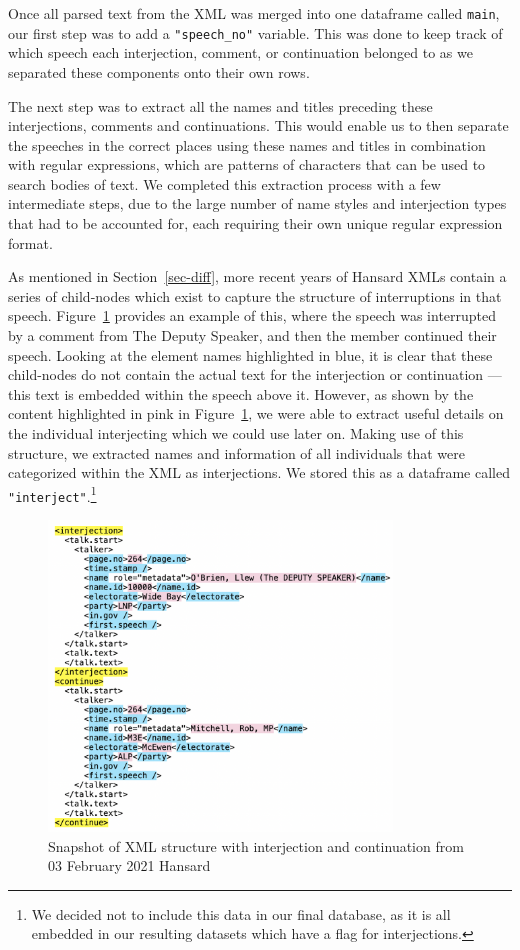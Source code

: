\documentclass[
  letterpaper,
  DIV=11,
  numbers=noendperiod]{scrartcl}
\begin{document}
Once all parsed text from the XML was merged into one dataframe called
\texttt{main}, our first step was to add a \texttt{"speech\_no"}
variable. This was done to keep track of which speech each interjection,
comment, or continuation belonged to as we separated these components
onto their own rows.

The next step was to extract all the names and titles preceding these
interjections, comments and continuations. This would enable us to then
separate the speeches in the correct places using these names and titles
in combination with regular expressions, which are patterns of
characters that can be used to search bodies of text. We completed this
extraction process with a few intermediate steps, due to the large
number of name styles and interjection types that had to be accounted
for, each requiring their own unique regular expression format.

As mentioned in Section~\ref{sec-diff}, more recent years of Hansard
XMLs contain a series of child-nodes which exist to capture the
structure of interruptions in that speech. Figure~\ref{fig-xml3}
provides an example of this, where the speech was interrupted by a
comment from The Deputy Speaker, and then the member continued their
speech. Looking at the element names highlighted in blue, it is clear
that these child-nodes do not contain the actual text for the
interjection or continuation --- this text is embedded within the speech
above it. However, as shown by the content highlighted in pink in
Figure~\ref{fig-xml3}, we were able to extract useful details on the
individual interjecting which we could use later on. Making use of this
structure, we extracted names and information of all individuals that
were categorized within the XML as interjections. We stored this as a
dataframe called \texttt{"interject"}.\footnote{We decided not to
  include this data in our final database, as it is all embedded in our
  resulting datasets which have a flag for interjections.}

\begin{figure}

{\centering \includegraphics[width=3.59375in,height=\textheight]{images/xml3.png}

}

\caption{\label{fig-xml3}Snapshot of XML structure with interjection and
continuation from 03 February 2021 Hansard}

\end{figure}
\end{document}

